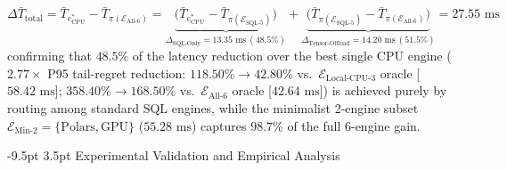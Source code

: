 \documentclass[10pt,a4paper]{article}
\makeatletter
\renewcommand\section{\@startsection{section}{1}{\z@}%
  {-9.5pt \@plus -2pt \@minus -1.5pt}%
  {3.5pt \@plus 1pt}%
  {\normalfont\large\bfseries}}
\makeatother
\begin{document}
\begin{enumerate}[leftmargin=1.5em,itemsep=0.8pt]
\begin{equation}
        \Delta \bar{T}_{\text{total}} = \bar{T}_{e^*_{\text{CPU}}} - \bar{T}_{\pi(\mathcal{E}_{\text{All-6}})} = \underbrace{\big(\bar{T}_{e^*_{\text{CPU}}} - \bar{T}_{\pi(\mathcal{E}_{\text{SQL-5}})}\big)}_{\Delta_{\text{SQL-Only}} = 13.35\text{ ms}\ (48.5\%)} + \underbrace{\big(\bar{T}_{\pi(\mathcal{E}_{\text{SQL-5}})} - \bar{T}_{\pi(\mathcal{E}_{\text{All-6}})}\big)}_{\Delta_{\text{Tensor-Offload}} = 14.20\text{ ms}\ (51.5\%)} = 27.55\text{ ms}
    \end{equation}
    confirming that $48.5\%$ of the latency reduction over the best single CPU engine ($2.77\times$ P95 tail-regret reduction: $118.50\% \rightarrow 42.80\%$ vs.\ $\mathcal{E}_{\text{Local-CPU-3}}$ oracle [$58.42\text{ ms}$]; $358.40\% \rightarrow 168.50\%$ vs.\ $\mathcal{E}_{\text{All-6}}$ oracle [$42.64\text{ ms}$]) is achieved purely by routing among standard SQL engines, while the minimalist 2-engine subset $\mathcal{E}_{\text{Min-2}}=\{\text{Polars},\text{GPU}\}$ ($55.28\text{ ms}$) captures $\mathbf{98.7\%}$ of the full 6-engine gain.
\end{enumerate}
\section{Experimental Validation and Empirical Analysis}
\end{document}
